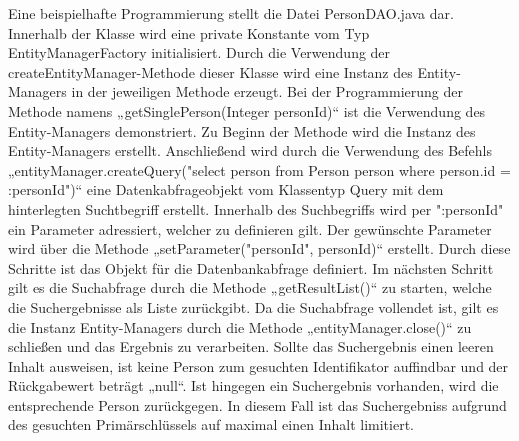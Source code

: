 \documentclass[11pt]{article}
\begin{document}
    \newpage
    Eine beispielhafte Programmierung stellt die Datei PersonDAO.java dar. 
    Innerhalb der Klasse wird eine private Konstante vom Typ EntityManagerFactory initialisiert. Durch die Verwendung
    der createEntityManager-Methode dieser Klasse wird eine Instanz des Entity-Managers in der jeweiligen Methode erzeugt.
    Bei der Programmierung der Methode namens „getSinglePerson(Integer personId)“ ist die Verwendung des Entity-Managers demonstriert.
    Zu Beginn der Methode wird die Instanz des Entity-Managers erstellt. Anschließend wird durch die Verwendung des Befehls 
    „entityManager.createQuery("select person from Person person where person.id = :personId")“ eine Datenkabfrageobjekt vom 
    Klassentyp Query mit dem hinterlegten Suchtbegriff erstellt. Innerhalb des Suchbegriffs wird per ":personId" ein Parameter adressiert, welcher zu definieren gilt.
    Der gewünschte Parameter wird über die Methode „setParameter("personId", personId)“ erstellt. Durch diese Schritte ist das Objekt für die Datenbankabfrage definiert.
    Im nächsten Schritt gilt es die Suchabfrage durch die Methode „getResultList()“ zu starten, welche die Suchergebnisse als Liste zurückgibt.
    Da die Suchabfrage vollendet ist, gilt es die Instanz Entity-Managers durch die Methode „entityManager.close()“ zu schließen und das Ergebnis zu verarbeiten.
    Sollte das Suchergebnis einen leeren Inhalt ausweisen, ist keine Person zum gesuchten Identifikator auffindbar und der Rückgabewert beträgt „null“.
    Ist hingegen ein Suchergebnis vorhanden, wird die entsprechende Person zurückgegen. In diesem Fall ist das Suchergebniss aufgrund des gesuchten Primärschlüssels auf maximal einen Inhalt limitiert.

    \newpage
\end{document}

